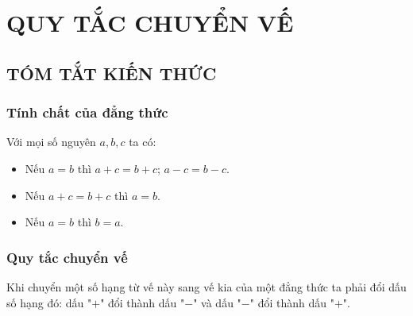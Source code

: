 \section{QUY TẮC CHUYỂN VẾ}
\subsection{TÓM TẮT KIẾN THỨC}
\begin{tomtat}
	\subsubsection{Tính chất của đẳng thức}
Với mọi số nguyên $a, b, c$ ta có:
\begin{itemize}
\item Nếu $a =b$ thì $a+c = b+c$; $a-c=b-c$.
\item Nếu $a+c = b+c$ thì $a=b$.
\item Nếu $a=b$ thì $b=a$.
\end{itemize}
	\subsubsection{Quy tắc chuyển vế}
Khi chuyển một số hạng từ vế này sang vế kia của một đẳng thức ta phải đổi dấu số hạng đó: dấu "$+$" đổi thành dấu "$-$" và dấu "$-$" đổi thành dấu "$+$". 
\end{tomtat}
